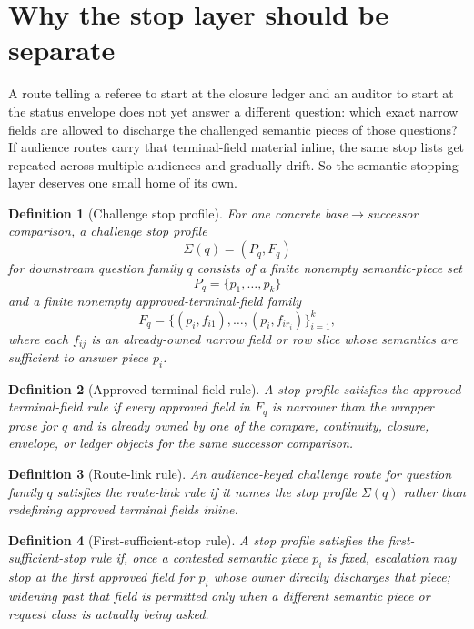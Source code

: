 \documentclass[11pt]{article}
\newtheorem{definition}{Definition}
\begin{document}
\section{Why the stop layer should be separate}
A route telling a referee to start at the closure ledger and an auditor to start at the status envelope does not yet answer a different question: which exact narrow fields are allowed to discharge the challenged semantic pieces of those questions?
If audience routes carry that terminal-field material inline, the same stop lists get repeated across multiple audiences and gradually drift.
So the semantic stopping layer deserves one small home of its own.

\begin{definition}[Challenge stop profile]
For one concrete base$\to$successor comparison, a \emph{challenge stop profile}
\[
\Sigma(q)=(P_q,F_q)
\]
for downstream question family $q$ consists of a finite nonempty semantic-piece set
\[
P_q=\{p_1,\dots,p_k\}
\]
and a finite nonempty approved-terminal-field family
\[
F_q=\{(p_i,f_{i1}),\dots,(p_i,f_{ir_i})\}_{i=1}^k,
\]
where each $f_{ij}$ is an already-owned narrow field or row slice whose semantics are sufficient to answer piece $p_i$.
\end{definition}

\begin{definition}[Approved-terminal-field rule]
A stop profile satisfies the \emph{approved-terminal-field rule} if every approved field in $F_q$ is narrower than the wrapper prose for $q$ and is already owned by one of the compare, continuity, closure, envelope, or ledger objects for the same successor comparison.
\end{definition}

\begin{definition}[Route-link rule]
An audience-keyed challenge route for question family $q$ satisfies the \emph{route-link rule} if it names the stop profile $\Sigma(q)$ rather than redefining approved terminal fields inline.
\end{definition}

\begin{definition}[First-sufficient-stop rule]
A stop profile satisfies the \emph{first-sufficient-stop rule} if, once a contested semantic piece $p_i$ is fixed, escalation may stop at the first approved field for $p_i$ whose owner directly discharges that piece; widening past that field is permitted only when a different semantic piece or request class is actually being asked.
\end{definition}
\end{document}
